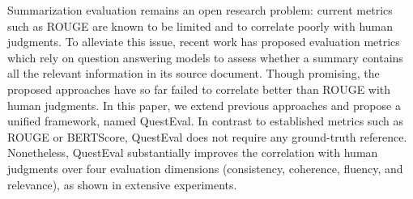 Summarization evaluation remains an open research problem: current metrics such as ROUGE are known to be limited and to correlate poorly with human judgments. To alleviate this issue, recent work has proposed evaluation metrics which rely on question answering models to assess whether a summary contains all the relevant information in its source document. Though promising, the proposed approaches have so far failed to correlate better than ROUGE with human judgments. In this paper, we extend previous approaches and propose a unified framework, named QuestEval. In contrast to established metrics such as ROUGE or BERTScore, QuestEval does not require any ground-truth reference. Nonetheless, QuestEval substantially improves the correlation with human judgments over four evaluation dimensions (consistency, coherence, fluency, and relevance), as shown in extensive experiments.
